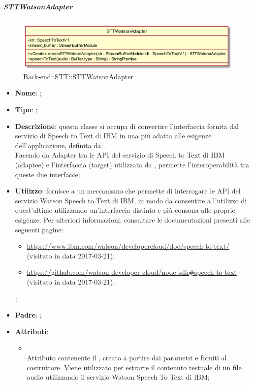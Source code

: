 \hypertarget{STTWatsonAdapter_label}{\subparagraph{STTWatsonAdapter}}
\begin{figure}[h]
	\centering
	\includegraphics[width=\textwidth,height=\textheight,keepaspectratio]{images/ClassSTTWatsonAdapter.png}
	\caption{Back-end::STT::STTWatsonAdapter}
\end{figure}
\begin{itemize}
	\item \textbf{Nome}: ;
	\item \textbf{Tipo}: ;
	\item \textbf{Descrizione}: questa classe si occupa di convertire l'interfaccia fornita dal servizio di Speech to Text di IBM in una più adatta alle esigenze dell'applicazione, definita da . \\
	Facendo da Adapter tra le API del servizio di Speech to Text di IBM (adaptee) e l'interfaccia  (target) utilizzata da , permette l'interoperabilità tra queste due interfacce;
	\item \textbf{Utilizzo}: fornisce a  un meccanismo che permette di interrogare le API del servizio Watson Speech to Text di IBM, in modo da consentire a  l'utilizzo di quest'ultime utilizzando un'interfaccia distinta e più consona alle proprie esigenze.
	Per ulteriori informazioni, consultare le documentazioni presenti alle seguenti pagine:
	\begin{itemize}
		\item \url{https://www.ibm.com/watson/developercloud/doc/speech-to-text/}  (visitato in data 2017-03-21);
		\item \url{https://github.com/watson-developer-cloud/node-sdk#speech-to-text}  (visitato in data 2017-03-21).
	\end{itemize};
	\item \textbf{Padre}: ;
	\item \textbf{Attributi}:
	\begin{itemize}
		\item[]  \\
		Attributo contenente il , creato a partire dai parametri  e  forniti al costruttore. Viene utilizzato per estrarre il contenuto testuale di un file audio utilizzando il servizio Watson Speech To Text di IBM;

\end{itemize}
\end{itemize}
